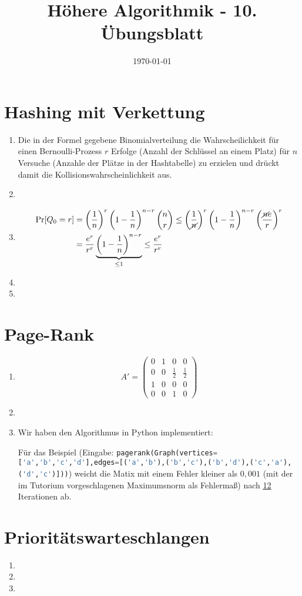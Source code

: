 \documentclass[a4paper,10pt]{article}
\title{H\"ohere Algorithmik - 10. \"Ubungsblatt}
\author{\Authors}
\date{\today}
\begin{document}
\maketitle

\section{Hashing mit Verkettung}
\begin{enumerate}
\item   Die in der Formel gegebene Binomialverteilung die Wahrscheilichkeit für einen Bernoulli-Prozess $r$ Erfolge (Anzahl der Schlüssel an einem Platz) für $n$ Versuche (Anzahle der Plätze in der Hashtabelle) zu erzielen und drückt damit die Kollisionswahrscheinlichkeit aus.
\item   
\item   \begin{align*}
            \text{Pr}[Q_0 = r] &= \left(\frac{1}{n}\right)^r \left(1 - \frac{1}{n}\right)^{n-r} \binom{n}{r}
                               \leq \left(\frac{1}{\cancel{n}}\right)^r \left(1 - \frac{1}{n}\right)^{n-r} \left(\frac{\cancel{n}e}{r}\right)^r \\
                               &= \frac{e^r}{r^r} \underbrace{\left(1 - \frac{1}{n}\right)^{n-r}}_{\leq 1} \leq \frac{e^r}{r^r}
        \end{align*}
\item   
\item   
\end{enumerate}

\section{Page-Rank}
\begin{enumerate}
\item   \[
            A' = \begin{pmatrix}
                0 & 1 & 0 & 0 \\
                0 & 0 & \frac{1}{2} & \frac{1}{2} \\
                1 & 0 & 0 & 0 \\
                0 & 0 & 1 & 0
            \end{pmatrix}
        \]
\item   
\item   Wir haben den Algorithmus in Python implementiert:
        
        Für das Beispiel (Eingabe: \lstinline[language=Python]!pagerank(Graph(vertices=['a','b','c','d'],edges=[('a','b'),('b','c'),('b','d'),('c','a'),('d','c')]))!) weicht die Matix mit einem Fehler kleiner als $0{,}001$ (mit der im Tutorium vorgeschlagenen Maximumsnorm als Fehlermaß) nach \underline{\underline{12}} Iterationen ab.
\end{enumerate}

\section{Prioritätswarteschlangen}
\begin{enumerate}
\item   
\item   
\item   
\end{enumerate}
\end{document}
